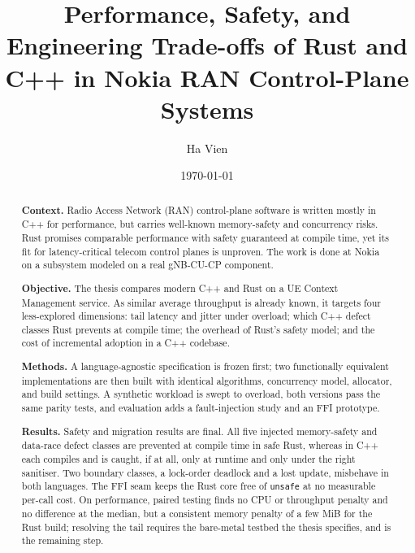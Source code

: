 \documentclass[english,twoside,openright,a4paper,censored,csm,software-track-2020]{HYthesisML}
\title{Performance, Safety, and Engineering Trade-offs of Rust and C++ in Nokia RAN Control-Plane Systems}
\author{Ha Vien}
\date{\today}
\begin{document}
\maketitle


{\singlespacing
\begin{otherlanguage}{english}
\begin{abstract}
\noindent\textbf{Context.}
Radio Access Network (RAN) control-plane software is written mostly in C++ for performance, but
carries well-known memory-safety and concurrency risks. Rust promises comparable performance
with safety guaranteed at compile time, yet its fit for latency-critical telecom control planes
is unproven. The work is done at Nokia on a subsystem modeled on a real gNB-CU-CP component.

\noindent\textbf{Objective.}
The thesis compares modern C++ and Rust on a UE Context Management service. As similar average
throughput is already known, it targets four less-explored dimensions: tail latency and jitter
under overload; which C++ defect classes Rust prevents at compile time; the overhead of Rust's
safety model; and the cost of incremental adoption in a C++ codebase.

\noindent\textbf{Methods.}
A language-agnostic specification is frozen first; two functionally equivalent implementations
are then built with identical algorithms, concurrency model, allocator, and build settings. A
synthetic workload is swept to overload, both versions pass the same parity tests, and
evaluation adds a fault-injection study and an FFI prototype.

\noindent\textbf{Results.}
Safety and migration results are final. All five injected memory-safety and data-race defect
classes are prevented at compile time in safe Rust, whereas in C++ each compiles and is caught,
if at all, only at runtime and only under the right sanitiser. Two boundary classes, a lock-order
deadlock and a lost update, misbehave in both languages. The FFI seam keeps the Rust core free of \texttt{unsafe} at no measurable per-call
cost. On performance, paired testing finds no CPU or throughput penalty and no difference at the
median, but a consistent memory penalty of a few MiB for the Rust build; resolving the tail
requires the bare-metal testbed the thesis specifies, and is the remaining step.


\end{abstract}
\end{otherlanguage}}
\end{document}
